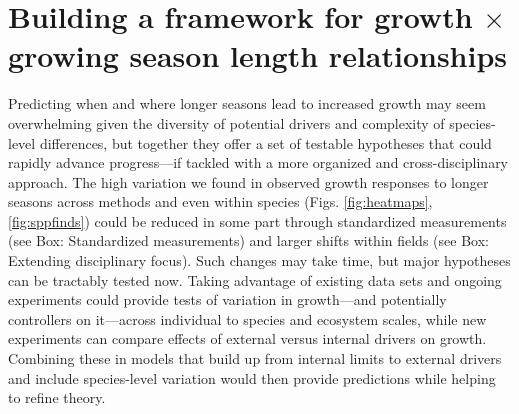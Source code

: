 \documentclass[11pt]{article}
\begin{document}
\section*{Building a framework for growth $\times$ growing season length relationships} %
Predicting when and where longer seasons lead to increased growth may seem overwhelming given the diversity of potential drivers and complexity of species-level differences, but together they offer a set of testable hypotheses that could rapidly advance progress---if tackled with a more organized and cross-disciplinary approach. The high variation we found in observed growth responses to longer seasons across methods and even within species (Figs. \ref{fig:heatmaps}, \ref{fig:sppfinds}) could be reduced in some part through standardized measurements (see Box: Standardized measurements) and larger shifts within fields (see Box: Extending disciplinary focus). Such changes may take time, but major hypotheses can be tractably tested now. Taking advantage of existing data sets and ongoing experiments could provide tests of variation in growth---and potentially controllers on it---across individual to species and ecosystem scales, while new experiments can compare effects of external versus internal drivers on growth. Combining these in models that build up from internal limits to external drivers and include species-level variation would then provide predictions while helping to refine theory. 

\end{document}
